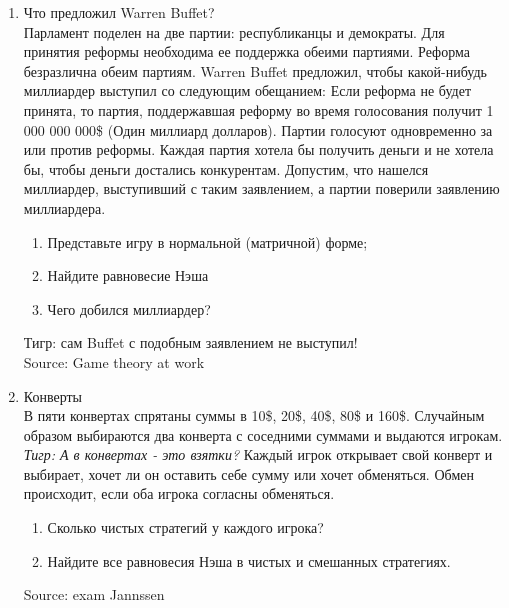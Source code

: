 \documentclass[pdftex,12pt,a4paper]{article}
\begin{document}
\begin{enumerate}
\item Что предложил Warren Buffet? \\
Парламент поделен на две партии: республиканцы и демократы. Для принятия реформы необходима ее поддержка обеими партиями. Реформа безразлична обеим партиям. Warren Buffet предложил, чтобы какой-нибудь миллиардер выступил со следующим обещанием: Если реформа не будет принята, то партия, поддержавшая реформу во время голосования получит 1 000 000 000\$ (Один миллиард долларов). Партии голосуют одновременно  за или против реформы. Каждая партия хотела бы получить деньги и не хотела бы, чтобы деньги достались конкурентам. Допустим, что нашелся миллиардер, выступивший с таким заявлением, а партии поверили заявлению миллиардера.
\begin{enumerate}
\item Представьте игру в нормальной (матричной) форме; 
\item Найдите равновесие Нэша
\item Чего добился миллиардер? 
\end{enumerate}
Тигр: сам Buffet с подобным заявлением не выступил!\\
Source: Game theory at work 

\item Конверты \\
В пяти конвертах спрятаны суммы в 10\$, 20\$, 40\$, 80\$ и 160\$. Случайным образом выбираются два конверта с соседними суммами и выдаются игрокам. {\it Тигр: А в конвертах - это взятки?} Каждый игрок открывает свой конверт и выбирает, хочет ли он оставить себе сумму или хочет обменяться. Обмен происходит, если оба игрока согласны обменяться.
\begin{enumerate}
\item  Сколько чистых стратегий у каждого игрока?
\item Найдите все равновесия Нэша в чистых и смешанных стратегиях.
\end{enumerate}
Source: exam Jannssen 


\end{enumerate}
\end{document}

